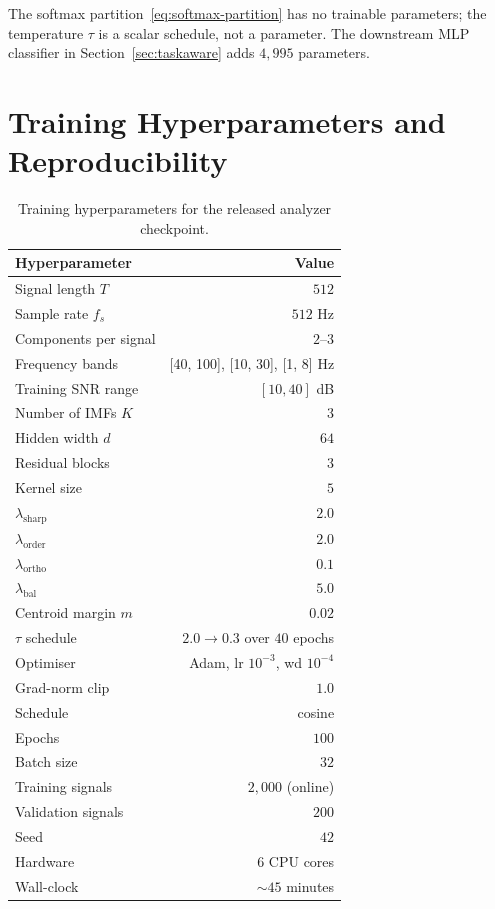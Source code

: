\documentclass[journal]{IEEEtran}
\theoremstyle{remark}
\begin{document}
The softmax partition~\eqref{eq:softmax-partition} has no trainable
parameters; the temperature $\tau$ is a scalar schedule, not a
parameter. The downstream MLP classifier in Section~\ref{sec:taskaware}
adds $4{,}995$ parameters.

\section{Training Hyperparameters and Reproducibility}
\label{app:repro}

\begin{table}[h]
\centering
\caption{Training hyperparameters for the released analyzer checkpoint.}
\label{tab:hparams}
\begin{tabular}{lr}
\toprule
Hyperparameter             & Value \\
\midrule
Signal length $T$          & $512$ \\
Sample rate $f_{s}$        & $512$ Hz \\
Components per signal      & $2$--$3$ \\
Frequency bands            & [40, 100], [10, 30], [1, 8] Hz \\
Training SNR range         & $[10, 40]$ dB \\
Number of IMFs $K$         & $3$ \\
Hidden width $d$           & $64$ \\
Residual blocks            & $3$ \\
Kernel size                & $5$ \\
$\lambda_{\mathrm{sharp}}$ & $2.0$ \\
$\lambda_{\mathrm{order}}$ & $2.0$ \\
$\lambda_{\mathrm{ortho}}$ & $0.1$ \\
$\lambda_{\mathrm{bal}}$   & $5.0$ \\
Centroid margin $m$        & $0.02$ \\
$\tau$ schedule            & $2.0 \to 0.3$ over $40$ epochs \\
Optimiser                  & Adam, lr $10^{-3}$, wd $10^{-4}$ \\
Grad-norm clip             & $1.0$ \\
Schedule                   & cosine \\
Epochs                     & $100$ \\
Batch size                 & $32$ \\
Training signals           & $2{,}000$ (online) \\
Validation signals         & $200$ \\
Seed                       & $42$ \\
Hardware                   & $6$ CPU cores \\
Wall-clock                 & $\sim\!45$ minutes \\
\bottomrule
\end{tabular}
\end{table}
\end{document}
